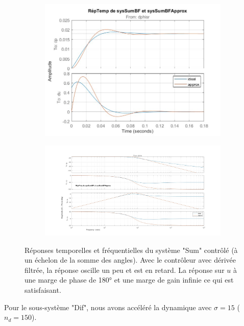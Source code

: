 \documentclass{report}
\begin{document}
\begin{figure}[h]  %
    \begin{subfigure}{.4\textwidth}
        \centering
        \includegraphics[width=\textwidth]{figures/reptempsumbf_approx.jpg}        
      \end{subfigure}    
      \begin{subfigure}{.6\textwidth}
        \centering
        \includegraphics[width=\textwidth]{figures/repfreqsumbf_approx.jpg}
      \end{subfigure}    
      \caption{Réponses temporelles et fréquentielles 
      du système "Sum" contrôlé (à un échelon de la somme des angles).
      Avec le contrôleur avec dérivée filtrée, la 
      réponse oscille un peu et est en retard.
      La réponse sur $u$ à une marge de phase de 180° et une 
      marge de gain infinie ce qui est satisfaisant.}
\end{figure}

Pour le sous-système "Dif", nous avons accéléré la dynamique avec
$\sigma = 15$ ($n_d=150$).
\end{document}
